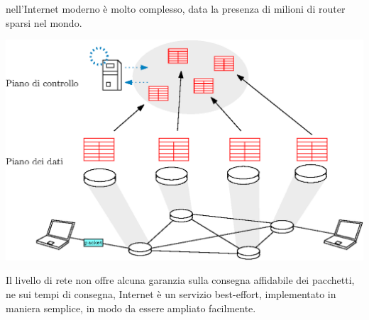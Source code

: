 \documentclass[12pt, letterpaper]{article}
\begin{document}
nell'Internet moderno è molto complesso, data la presenza di milioni di router sparsi nel mondo.\begin{center}
    \includegraphics[width=1\textwidth ]{images/dataAndControlPlane.eps}
\end{center}
Il livello di rete non offre alcuna garanzia sulla consegna affidabile dei pacchetti, ne sui tempi di consegna, 
Internet è un servizio best-effort, implementato in maniera semplice, in modo da essere ampliato facilmente.
\end{document}
